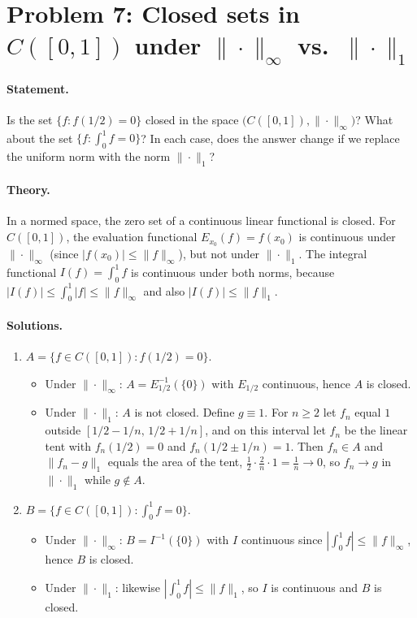 \documentclass[12pt,a4paper]{article}
\theoremstyle{plain}
\theoremstyle{definition}
\theoremstyle{remark}
\theoremstyle{remark}
\begin{document}
\section*{Problem 7: Closed sets in $C([0,1])$ under $\|\cdot\|_\infty$ vs.\ $\|\cdot\|_1$}

\paragraph{Statement.}
Is the set $\{f: f(1/2)=0\}$ closed in the space $\big(C([0,1]),\|\cdot\|_\infty\big)$?
What about the set $\{f:\int_0^1 f=0\}$?
In each case, does the answer change if we replace the uniform norm with the norm $\|\cdot\|_1$?

\paragraph{Theory.}
In a normed space, the zero set of a continuous linear functional is closed.
For $C([0,1])$,
the evaluation functional $E_{x_0}(f)=f(x_0)$ is continuous under $\|\cdot\|_\infty$ (since $|f(x_0)|\le\|f\|_\infty$),
but not under $\|\cdot\|_1$.
The integral functional $I(f)=\int_0^1 f$ is continuous under both norms, because
$|I(f)|\le\int_0^1 |f|\le \|f\|_\infty$ and also $|I(f)|\le \|f\|_1$.

\paragraph{Solutions.}
\begin{enumerate}
	\item[\textbf{A.}] $A=\{f\in C([0,1]): f(1/2)=0\}$.
	\begin{itemize}
		\item Under $\|\cdot\|_\infty$: $A=E_{1/2}^{-1}(\{0\})$ with $E_{1/2}$ continuous, hence $A$ is closed.
		\item Under $\|\cdot\|_1$: $A$ is not closed. Define $g\equiv 1$. For $n\ge 2$ let $f_n$ equal $1$ outside $[1/2-1/n,\,1/2+1/n]$, and on this interval let $f_n$ be the linear tent with $f_n(1/2)=0$ and $f_n(1/2\pm 1/n)=1$. Then $f_n\in A$ and
		$\|f_n-g\|_1$ equals the area of the tent, $\frac12\cdot \frac{2}{n}\cdot 1=\frac1n\to 0$, so $f_n\to g$ in $\|\cdot\|_1$ while $g\notin A$.
	\end{itemize}
	
	\item[\textbf{B.}] $B=\{f\in C([0,1]): \int_0^1 f=0\}$.
	\begin{itemize}
		\item Under $\|\cdot\|_\infty$: $B=I^{-1}(\{0\})$ with $I$ continuous since $|\int_0^1 f|\le \|f\|_\infty$, hence $B$ is closed.
		\item Under $\|\cdot\|_1$: likewise $|\int_0^1 f|\le \|f\|_1$, so $I$ is continuous and $B$ is closed.
	\end{itemize}
\end{enumerate}
\end{document}
